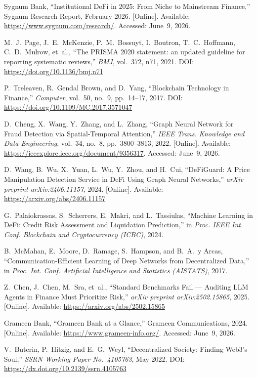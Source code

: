 \documentclass[12pt,a4paper]{report}
\begin{document}
{\begin{enumerate}[label={[\arabic*]}]
\item Sygnum Bank, ``Institutional DeFi in 2025: From Niche to Mainstream Finance,'' Sygnum Research Report, February 2026. [Online]. Available: \url{https://www.sygnum.com/research/}. Accessed: June~9, 2026.

\item M.~J.~Page, J.~E.~McKenzie, P.~M.~Bossuyt, I.~Boutron, T.~C.~Hoffmann, C.~D.~Mulrow, et~al., ``The PRISMA 2020 statement: an updated guideline for reporting systematic reviews,'' \textit{BMJ}, vol.~372, n71, 2021. DOI: \url{https://doi.org/10.1136/bmj.n71}

\item P.~Treleaven, R.~Gendal Brown, and D.~Yang, ``Blockchain Technology in Finance,'' \textit{Computer}, vol.~50, no.~9, pp.~14--17, 2017. DOI: \url{https://doi.org/10.1109/MC.2017.3571047}
\item D.~Cheng, X.~Wang, Y.~Zhang, and L.~Zhang, ``Graph Neural Network for Fraud Detection via Spatial-Temporal Attention,'' \textit{IEEE Trans. Knowledge and Data Engineering}, vol.~34, no.~8, pp.~3800--3813, 2022. [Online]. Available: \url{https://ieeexplore.ieee.org/document/9356317}. Accessed: June~9, 2026.
\item D.~Wang, B.~Wu, X.~Yuan, L.~Wu, Y.~Zhou, and H.~Cui, ``DeFiGuard: A Price Manipulation Detection Service in DeFi Using Graph Neural Networks,'' \textit{arXiv preprint arXiv:2406.11157}, 2024. [Online]. Available: \url{https://arxiv.org/abs/2406.11157}
\item G.~Palaiokrassas, S.~Scherrers, E.~Makri, and L.~Tassiulas, ``Machine Learning in DeFi: Credit Risk Assessment and Liquidation Prediction,'' in \textit{Proc. IEEE Int. Conf. Blockchain and Cryptocurrency (ICBC)}, 2024.
\item B.~McMahan, E.~Moore, D.~Ramage, S.~Hampson, and B.~A.~y Arcas, ``Communication-Efficient Learning of Deep Networks from Decentralized Data,'' in \textit{Proc. Int. Conf. Artificial Intelligence and Statistics (AISTATS)}, 2017.
\item Z.~Chen, J.~Chen, M.~Sra, et~al., ``Standard Benchmarks Fail --- Auditing LLM Agents in Finance Must Prioritize Risk,'' \textit{arXiv preprint arXiv:2502.15865}, 2025. [Online]. Available: \url{https://arxiv.org/abs/2502.15865}
\item Grameen Bank, ``Grameen Bank at a Glance,'' Grameen Communications, 2024. [Online]. Available: \url{https://www.grameen-info.org/}. Accessed: June~9, 2026.
\item V.~Buterin, P.~Hitzig, and E.~G.~Weyl, ``Decentralized Society: Finding Web3's Soul,'' \textit{SSRN Working Paper No.~4105763}, May 2022. DOI: \url{https://dx.doi.org/10.2139/ssrn.4105763}


\end{enumerate}}
\end{document}
